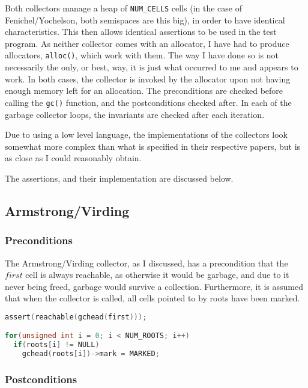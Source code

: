 Both collectors manage a heap of \texttt{NUM\_CELLS} cells (in the
case of Fenichel/Yochelson, both semispaces are this big), in order to
have identical characteristics. This then allows identical assertions
to be used in the test program. As neither collector comes with an
allocator, I have had to produce allocators, \texttt{alloc()}, which
work with them. The way I have done so is not necessarily the only, or
best, way, it is just what occurred to me and appears to work. In both
cases, the collector is invoked by the allocator upon not having
enough memory left for an allocation. The preconditions are checked
before calling the \texttt{gc()} function, and the postconditions
checked after. In each of the garbage collector loops, the invariants
are checked after each iteration.

Due to using a low level language, the implementations of the
collectors look somewhat more complex than what is specified in their
respective papers, but is as close as I could reasonably obtain.

The assertions, and their implementation are discussed below.

\subsection{Armstrong/Virding}
\label{sec:results-impl-ms}

\subsubsection{Preconditions}
\label{sec:results-impl-ms-pre}

The Armstrong/Virding collector, as I discussed, has a precondition
that the $first$ cell is always reachable, as otherwise it would be
garbage, and due to it never being freed, garbage would survive a
collection. Furthermore, it is assumed that when the collector is
called, all cells pointed to by roots have been marked.

\begin{lstlisting}[language=C,caption={Armstrong/Virding Preconditions}]
assert(reachable(gchead(first)));

for(unsigned int i = 0; i < NUM_ROOTS; i++)
  if(roots[i] != NULL)
    gchead(roots[i])->mark = MARKED;
\end{lstlisting}

\subsubsection{Postconditions}
\label{sec:results-impl-ms-post}


